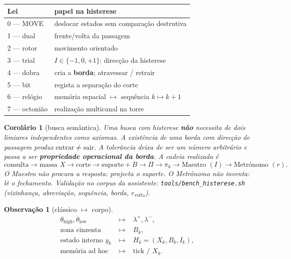 \documentclass[11pt,a4paper]{article}
\newtheorem{corolario}{Corolário}
\newtheorem{observacao}{Observação}
\newcommand{\code}[1]{\texttt{#1}}
\begin{document}
\begin{center}\small
\begin{tabular}{@{}lp{9.2cm}@{}}
\toprule
Lei & papel na histerese \\
\midrule
0 --- MOVE & deslocar estados sem comparação destrutiva \\
1 --- dual & frente/volta da passagem \\
2 --- rotor & movimento orientado \\
3 --- trial & $I\in\{-1,0,+1\}$: direcção da histerese \\
4 --- dobra & cria a \textbf{borda}; atravessar / retrair \\
5 --- bit & regista a separação do corte \\
6 --- relógio & memória espacial $\mapsto$ sequência $k\mapsto k+1$ \\
7 --- octonião & realização multicanal na torre \\
\bottomrule
\end{tabular}
\end{center}

\begin{corolario}[busca semântica]\label{cor:histerese-busca}
Uma busca com histerese \textbf{não} necessita de dois limiares
independentes como axiomas. A existência de uma borda com direcção
de passagem produz $\mathrm{entrar}\neq\mathrm{sair}$. A tolerância
deixa de ser um número arbitrário e passa a ser \textbf{propriedade
operacional da borda}. A cadeia realizada é
\[
\boxed{
\text{consulta}
\to
\text{massa }X
\to
\text{corte}
\to
\text{suporte}+B
\to
\Pi
\to
\pi_k
\to
\text{Maestro }(I)
\to
\text{Metrónomo }(r).
}
\]
O Maestro não procura a resposta: projecta o suporte. O Metrónomo não
inventa: lê o fechamento. Validação no corpus da assistente:
\code{tools/bench\_histerese.sh} (vizinhança, abreviação, sequência,
borda, $r_{\mathrm{volta}}$).
\end{corolario}

\begin{observacao}[clássico $\mapsto$ corpo]
\[
\boxed{
\begin{array}{rcl}
\theta_{\mathrm{high}},\theta_{\mathrm{low}}
&\;\longmapsto\;&
\lambda^{+},\lambda^{-},\\[2pt]
\text{zona cinzenta}
&\;\longmapsto\;&
B_k,\\[2pt]
\text{estado interno }y_k
&\;\longmapsto\;&
H_k=(X_k,B_k,I_k),\\[2pt]
\text{memória ad hoc}
&\;\longmapsto\;&
\text{tick / }X_k.
\end{array}
}
\]
\end{observacao}
\end{document}
